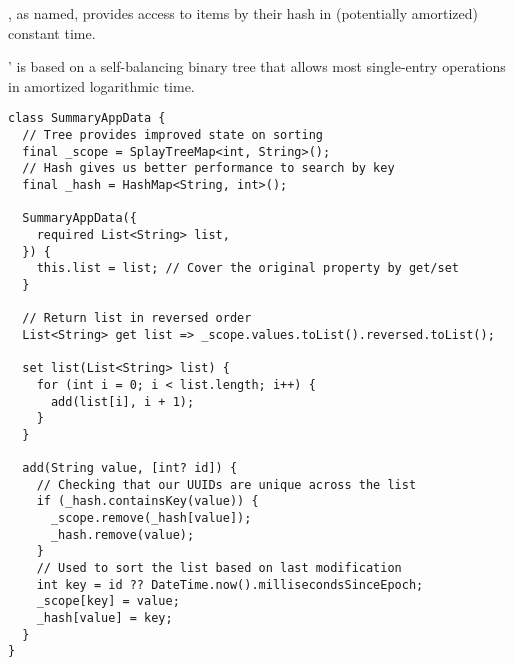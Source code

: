 , as named, provides access to items by their hash in (potentially amortized) constant time.

' is based on a self-balancing binary tree that allows most single-entry operations in amortized 
logarithmic time.

\begin{lstlisting}
class SummaryAppData {
  // Tree provides improved state on sorting
  final _scope = SplayTreeMap<int, String>();
  // Hash gives us better performance to search by key
  final _hash = HashMap<String, int>();

  SummaryAppData({
    required List<String> list,
  }) {
    this.list = list; // Cover the original property by get/set
  }

  // Return list in reversed order
  List<String> get list => _scope.values.toList().reversed.toList();

  set list(List<String> list) {
    for (int i = 0; i < list.length; i++) {
      add(list[i], i + 1);
    }
  }

  add(String value, [int? id]) {
    // Checking that our UUIDs are unique across the list
    if (_hash.containsKey(value)) {
      _scope.remove(_hash[value]);
      _hash.remove(value);
    }
    // Used to sort the list based on last modification 
    int key = id ?? DateTime.now().millisecondsSinceEpoch;
    _scope[key] = value;
    _hash[value] = key;
  }
}
\end{lstlisting}